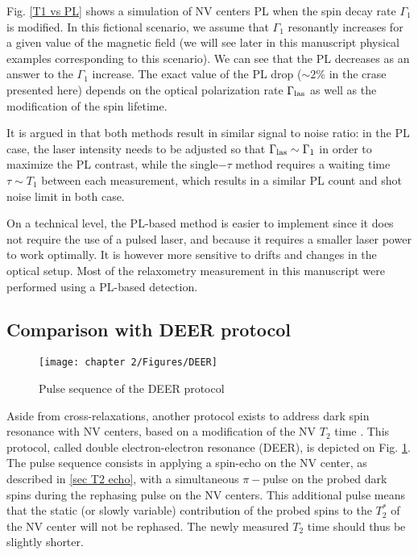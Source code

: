 \documentclass[a4paper, 11pt]{book}
\begin{document}
 Fig. \ref{T1 vs PL} shows a simulation of NV centers PL when the spin decay rate $\Gamma_1$ is modified. In this fictional scenario, we assume that $\Gamma_1$ resonantly increases for a given value of the magnetic field (we will see later in this manuscript physical examples corresponding to this scenario). We can see that the PL decreases as an answer to the $\Gamma_1$ increase. The exact value of the PL drop ($\sim 2\%$ in the crase presented here) depends on the optical polarization rate $\Gamma_{\rm las}$ as well as the modification of the spin lifetime. 

It is argued in \citep{finco2021imaging} that both methods result in similar signal to noise ratio: in the PL case, the laser intensity needs to be adjusted so that $\Gamma_{\rm las} \sim \Gamma_1$ in order to maximize the PL contrast, while the single$-\tau$ method requires a waiting time $\tau \sim T_1$ between each measurement, which results in a similar PL count and shot noise limit in both case.

On a technical level, the PL-based method is easier to implement since it does not require the use of a pulsed laser, and because it requires a smaller laser power to work optimally. It is however more sensitive to drifts and changes in the optical setup. Most of the relaxometry measurement in this manuscript were performed using a PL-based detection.

\subsection{Comparison with DEER protocol}

\begin{figure}[h]
\centering
\texttt{[image: chapter 2/Figures/DEER]}
\caption{Pulse sequence of the DEER protocol}
\label{DEER}
\end{figure}

Aside from cross-relaxations, another protocol exists to address dark spin resonance with NV centers, based on a modification of the NV $T_2$ time \citep{mamin2012detecting, serbyn2014interferometric}. This protocol, called double electron-electron resonance (DEER), is depicted on Fig. \ref{DEER}. The pulse sequence consists in applying a spin-echo on the NV center, as described in \ref{sec T2 echo}, with a simultaneous $\pi-$pulse on the probed dark spins during the rephasing pulse on the NV centers. This additional pulse means that the static (or slowly variable) contribution of the probed spins to the $T_2^*$ of the NV center will not be rephased. The newly measured $T_2$ time should thus be slightly shorter.
\end{document}
